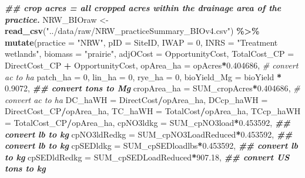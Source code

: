 \documentclass[
]{article}
\newenvironment{Shaded}{\begin{snugshade}}{\end{snugshade}}
\newcommand{\AttributeTok}[1]{\textcolor[rgb]{0.13,0.29,0.53}{#1}}
\newcommand{\CommentTok}[1]{\textcolor[rgb]{0.56,0.35,0.01}{\textit{#1}}}
\newcommand{\DecValTok}[1]{\textcolor[rgb]{0.00,0.00,0.81}{#1}}
\newcommand{\DocumentationTok}[1]{\textcolor[rgb]{0.56,0.35,0.01}{\textbf{\textit{#1}}}}
\newcommand{\FloatTok}[1]{\textcolor[rgb]{0.00,0.00,0.81}{#1}}
\newcommand{\FunctionTok}[1]{\textcolor[rgb]{0.13,0.29,0.53}{\textbf{#1}}}
\newcommand{\NormalTok}[1]{#1}
\newcommand{\OtherTok}[1]{\textcolor[rgb]{0.56,0.35,0.01}{#1}}
\newcommand{\SpecialCharTok}[1]{\textcolor[rgb]{0.81,0.36,0.00}{\textbf{#1}}}
\newcommand{\StringTok}[1]{\textcolor[rgb]{0.31,0.60,0.02}{#1}}
\begin{document}
\begin{Shaded}
\begin{Highlighting}[]
\DocumentationTok{\#\# crop acres = all cropped acres within the drainage area of the practice.}
\NormalTok{NRW\_BIOraw }\OtherTok{\textless{}{-}} \FunctionTok{read\_csv}\NormalTok{(}\StringTok{"../data/raw/NRW\_practiceSummary\_BIOv4.csv"}\NormalTok{) }\SpecialCharTok{\%\textgreater{}\%}
  \FunctionTok{mutate}\NormalTok{(}\AttributeTok{practice =} \StringTok{"NRW"}\NormalTok{,}
         \AttributeTok{pID =}\NormalTok{ SiteID,}
         \AttributeTok{IWAP =} \DecValTok{0}\NormalTok{,}
         \AttributeTok{INRS =} \StringTok{"Treatment wetlands"}\NormalTok{,}
         \AttributeTok{biomass =} \StringTok{"prairie"}\NormalTok{,}
         \AttributeTok{adjOCost =}\NormalTok{ OpportunityCost,}
         \AttributeTok{TotalCost\_CP =}\NormalTok{ DirectCost\_CP }\SpecialCharTok{+}\NormalTok{ OpportunityCost,}
         \AttributeTok{opArea\_ha =}\NormalTok{ opAcres}\SpecialCharTok{*}\FloatTok{0.404686}\NormalTok{, }\CommentTok{\# convert ac to ha}
         \AttributeTok{patch\_ha =} \DecValTok{0}\NormalTok{,}
         \AttributeTok{lin\_ha =} \DecValTok{0}\NormalTok{,}
         \AttributeTok{rye\_ha =} \DecValTok{0}\NormalTok{,}
         \AttributeTok{bioYield\_Mg =}\NormalTok{ bioYield }\SpecialCharTok{*} \FloatTok{0.9072}\NormalTok{, }\DocumentationTok{\#\# convert tons to Mg}
         \AttributeTok{cropArea\_ha =}\NormalTok{ SUM\_cropAcres}\SpecialCharTok{*}\FloatTok{0.404686}\NormalTok{, }\CommentTok{\# convert ac to ha}
         \AttributeTok{DC\_haWH =}\NormalTok{ DirectCost}\SpecialCharTok{/}\NormalTok{opArea\_ha,}
         \AttributeTok{DCcp\_haWH =}\NormalTok{ DirectCost\_CP}\SpecialCharTok{/}\NormalTok{opArea\_ha,}
         \AttributeTok{TC\_haWH =}\NormalTok{ TotalCost}\SpecialCharTok{/}\NormalTok{opArea\_ha,}
         \AttributeTok{TCcp\_haWH =}\NormalTok{ TotalCost\_CP}\SpecialCharTok{/}\NormalTok{opArea\_ha,}
         \AttributeTok{cpNO3ldkg =}\NormalTok{ SUM\_cpNO3load}\SpecialCharTok{*}\FloatTok{0.453592}\NormalTok{, }\DocumentationTok{\#\# convert lb to kg}
         \AttributeTok{cpNO3ldRedkg =}\NormalTok{ SUM\_cpNO3LoadReduced}\SpecialCharTok{*}\FloatTok{0.453592}\NormalTok{, }\DocumentationTok{\#\# convert lb to kg}
         \AttributeTok{cpSEDldkg =}\NormalTok{ SUM\_cpSEDloadlbs}\SpecialCharTok{*}\FloatTok{0.453592}\NormalTok{, }\DocumentationTok{\#\# convert lb to kg}
         \AttributeTok{cpSEDldRedkg =}\NormalTok{ SUM\_cpSEDLoadReduced}\SpecialCharTok{*}\FloatTok{907.18}\NormalTok{, }\DocumentationTok{\#\# convert US tons to kg}

\end{Highlighting}
\end{Shaded}
\end{document}
